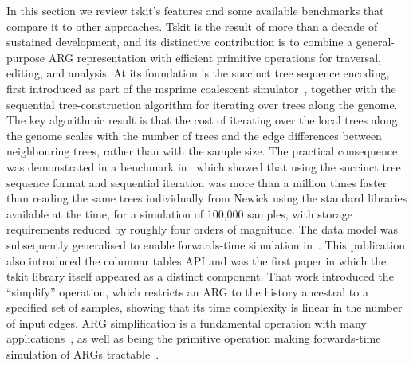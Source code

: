 \documentclass{article}
\begin{document}
In this section we review tskit's features and some available benchmarks
that compare it to other approaches.
Tskit is the result of more than a decade of sustained development,
and its distinctive contribution is to combine a general-purpose ARG
representation with efficient primitive operations for traversal,
editing, and analysis.
At its foundation is the succinct tree sequence encoding,
first introduced as part of the msprime coalescent
simulator~\citep{kelleher2016efficient}, together with the
sequential tree-construction algorithm for iterating over
trees along the genome.
The key algorithmic result is that
the cost of iterating over the local trees along the genome scales
with the number of trees and the edge differences between neighbouring
trees, rather than with the sample size.
The practical consequence was demonstrated in a benchmark in~\citet{kelleher2016efficient} 
which showed that using the succinct tree sequence format and sequential iteration was more
than a million times faster than reading the same trees individually
from Newick using the standard libraries available at the time, for a
simulation of 100,000 samples, with storage requirements reduced by
roughly four orders of magnitude.
The data model was subsequently generalised to enable forwards-time
simulation in~\citet{kelleher2018efficient}. This publication also
introduced the columnar tables API and was the first paper in which
the tskit library itself appeared as a distinct component.
That work introduced the ``simplify'' operation, which restricts an ARG
to the history ancestral to a specified set of samples, showing that
its time complexity is linear in the number of input edges.
ARG simplification is a fundamental operation with many
applications~\citep{wong2024general}, as well as being the primitive
operation making forwards-time simulation of ARGs
tractable~\citep{haller2018tree}.
\end{document}
